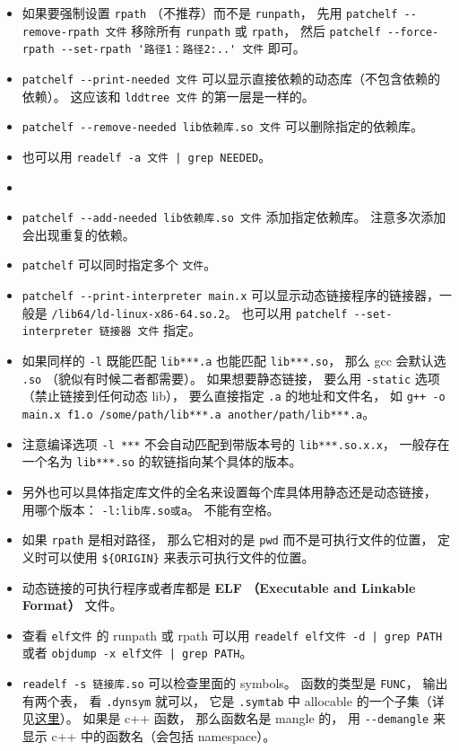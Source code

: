 \begin{itemize}
\item 如果要强制设置 \verb`rpath` （不推荐）而不是 \verb`runpath`， 先用 \verb`patchelf --remove-rpath 文件` 移除所有 \verb`runpath` 或 \verb`rpath`， 然后 \verb`patchelf --force-rpath --set-rpath '路径1：路径2:..' 文件` 即可。
\item \verb`patchelf --print-needed 文件` 可以显示直接依赖的动态库（不包含依赖的依赖）。 这应该和 \verb`lddtree 文件` 的第一层是一样的。
\item \verb`patchelf --remove-needed lib依赖库.so 文件` 可以删除指定的依赖库。
\item 也可以用 \verb`readelf -a 文件 | grep NEEDED`。
\item \verb``
\item \verb`patchelf --add-needed lib依赖库.so 文件` 添加指定依赖库。 注意多次添加会出现重复的依赖。
\item \verb`patchelf` 可以同时指定多个 \verb`文件`。
\item \verb`patchelf --print-interpreter main.x` 可以显示动态链接程序的链接器，一般是 \verb`/lib64/ld-linux-x86-64.so.2`。 也可以用 \verb`patchelf --set-interpreter 链接器 文件` 指定。 
\item 如果同样的 \verb`-l` 既能匹配 \verb`lib***.a` 也能匹配 \verb`lib***.so`， 那么 gcc 会默认选 \verb`.so` （貌似有时候二者都需要）。 如果想要静态链接， 要么用 \verb`-static` 选项（禁止链接到任何动态 lib）， 要么直接指定 \verb`.a` 的地址和文件名， 如 \verb`g++ -o main.x f1.o /some/path/lib***.a another/path/lib***.a`。
\item 注意编译选项 \verb`-l ***` 不会自动匹配到带版本号的 \verb`lib***.so.x.x`， 一般存在一个名为 \verb`lib***.so` 的软链指向某个具体的版本。
\item 另外也可以具体指定库文件的全名来设置每个库具体用静态还是动态链接， 用哪个版本： \verb`-l:lib库.so或a`。 不能有空格。
\item 如果 \verb`rpath` 是相对路径， 那么它相对的是 \verb`pwd` 而不是可执行文件的位置， 定义时可以使用 \verb`${ORIGIN}` 来表示可执行文件的位置。
\item 动态链接的可执行程序或者库都是 \textbf{ELF （Executable and Linkable Format）} 文件。
\item 查看 \verb`elf文件` 的 runpath 或 rpath 可以用 \verb`readelf elf文件 -d | grep PATH` 或者 \verb`objdump -x elf文件 | grep PATH`。
\item \verb`readelf -s 链接库.so` 可以检查里面的 symbols。 函数的类型是 \verb`FUNC`， 输出有两个表， 看 \verb`.dynsym` 就可以， 它是 \verb`.symtab` 中 allocable 的一个子集（详见\href{https://blogs.oracle.com/solaris/post/inside-elf-symbol-tables}{这里}）。 如果是 c++ 函数， 那么函数名是 mangle 的， 用 \verb`--demangle` 来显示 c++ 中的函数名（会包括 namespace）。

\end{itemize}
